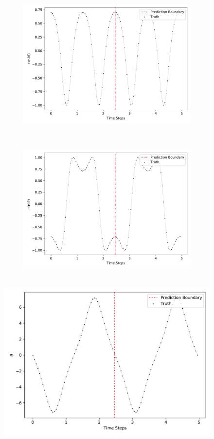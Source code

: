		\begin{figure}
			\centering
			\begin{subfigure}{0.5\linewidth}
				\centering
				\includegraphics[width=\linewidth]{figures/experiments/environments/observations-pendulum-gym-N0-D0.pdf}
			\end{subfigure}%
			~
			\begin{subfigure}{0.5\linewidth}
				\centering
				\includegraphics[width=\linewidth]{figures/experiments/environments/observations-pendulum-gym-N0-D1.pdf}
			\end{subfigure} \\
			\includegraphics[width=0.5\linewidth]{figures/experiments/environments/observations-pendulum-gym-N0-D2.pdf}

\end{figure}
